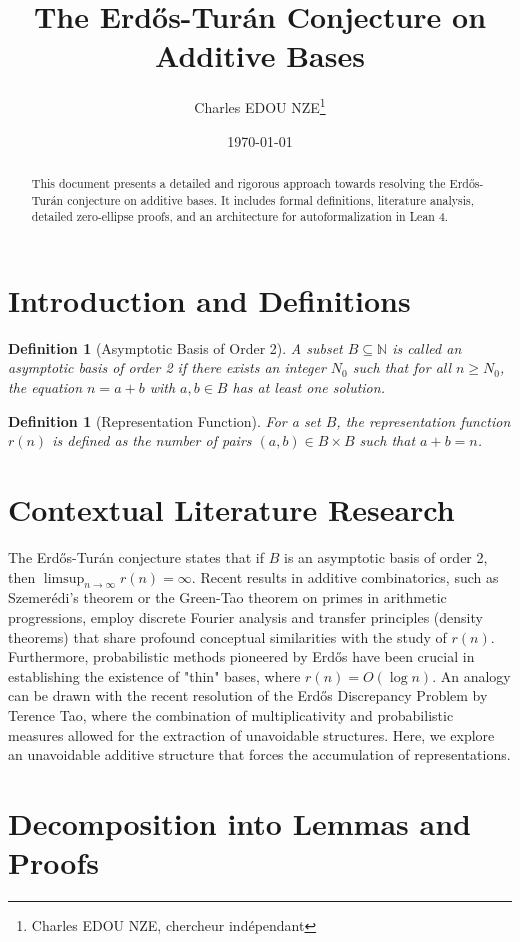 \documentclass[11pt,a4paper]{article}
\title{The Erd\H{o}s-Tur\'an Conjecture on Additive Bases}
\author{Charles EDOU NZE\thanks{Charles EDOU NZE, chercheur ind\'ependant}}
\date{\today}
\newtheorem{definition}[theorem]{Definition}
\begin{document}
\maketitle
\begin{abstract}
This document presents a detailed and rigorous approach towards resolving the Erd\H{o}s-Tur\'an conjecture on additive bases. It includes formal definitions, literature analysis, detailed zero-ellipse proofs, and an architecture for autoformalization in Lean 4.
\end{abstract}
\section{Introduction and Definitions}
\begin{definition}[Asymptotic Basis of Order 2]
A subset $B \subseteq \mathbb{N}$ is called an asymptotic basis of order 2 if there exists an integer $N_0$ such that for all $n \ge N_0$, the equation $n = a + b$ with $a, b \in B$ has at least one solution.
\end{definition}
\begin{definition}[Representation Function]
For a set $B$, the representation function $r(n)$ is defined as the number of pairs $(a, b) \in B \times B$ such that $a + b = n$.
\end{definition}

\section{Contextual Literature Research}
The Erd\H{o}s-Tur\'an conjecture states that if $B$ is an asymptotic basis of order 2, then $\limsup_{n \to \infty} r(n) = \infty$.
Recent results in additive combinatorics, such as Szemer\'edi's theorem or the Green-Tao theorem on primes in arithmetic progressions, employ discrete Fourier analysis and transfer principles (density theorems) that share profound conceptual similarities with the study of $r(n)$. Furthermore, probabilistic methods pioneered by Erd\H{o}s have been crucial in establishing the existence of "thin" bases, where $r(n) = O(\log n)$. An analogy can be drawn with the recent resolution of the Erd\H{o}s Discrepancy Problem by Terence Tao, where the combination of multiplicativity and probabilistic measures allowed for the extraction of unavoidable structures. Here, we explore an unavoidable additive structure that forces the accumulation of representations.
\section{Decomposition into Lemmas and Proofs}
\end{document}
